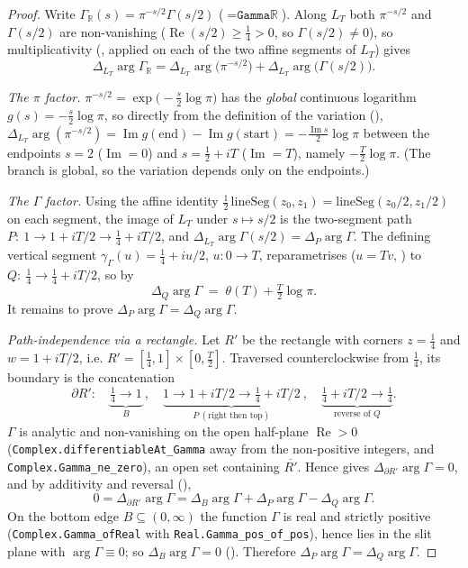 \begin{proof}
\leanok
{}
Write $\Gamma_{\mathbb R}(s)=\pi^{-s/2}\Gamma(s/2)$ ($=\texttt{Gammaℝ}$). Along $L_T$ both
$\pi^{-s/2}$ and $\Gamma(s/2)$ are non-vanishing ($\operatorname{Re}(s/2)\ge\tfrac14>0$,
so $\Gamma(s/2)\neq0$), so multiplicativity (, applied on each
of the two affine segments of $L_T$) gives
\[
  \Delta_{L_T}\arg\Gamma_{\mathbb R}
   = \Delta_{L_T}\arg\bigl(\pi^{-s/2}\bigr) + \Delta_{L_T}\arg\bigl(\Gamma(s/2)\bigr).
\]

\emph{The $\pi$ factor.} $\pi^{-s/2}=\exp\!\bigl(-\tfrac{s}{2}\log\pi\bigr)$ has the
\emph{global} continuous logarithm $g(s)=-\tfrac{s}{2}\log\pi$, so directly from the
definition of the variation (),
$\Delta_{L_T}\arg(\pi^{-s/2})=\operatorname{Im} g(\text{end})-\operatorname{Im}
g(\text{start})=-\tfrac{\operatorname{Im} s}{2}\log\pi$ between the endpoints $s=2$
($\operatorname{Im}=0$) and $s=\tfrac12+iT$ ($\operatorname{Im}=T$), namely
$-\tfrac{T}{2}\log\pi$. (The branch is global, so the variation depends only on the
endpoints.)

\emph{The $\Gamma$ factor.} Using the affine identity
$\tfrac12\,\mathrm{lineSeg}(z_0,z_1)=\mathrm{lineSeg}(z_0/2,z_1/2)$ on each segment, the
image of $L_T$ under $s\mapsto s/2$ is the two-segment path
$P:\ 1\to1+iT/2\to\tfrac14+iT/2$, and $\Delta_{L_T}\arg\Gamma(s/2)=\Delta_P\arg\Gamma$.
The defining vertical segment $\gamma_\Gamma(u)=\tfrac14+iu/2$, $u:0\to T$, reparametrises
($u=Tv$, ) to $Q:\ \tfrac14\to\tfrac14+iT/2$, so by
\[
  \Delta_Q\arg\Gamma \;=\; \theta(T)+\tfrac{T}{2}\log\pi .
\]
It remains to prove $\Delta_P\arg\Gamma=\Delta_Q\arg\Gamma$.

\emph{Path-independence via a rectangle.} Let $R'$ be the rectangle with corners
$z=\tfrac14$ and $w=1+iT/2$, i.e. $R'=[\tfrac14,1]\times[0,\tfrac T2]$. Traversed
counterclockwise from $\tfrac14$, its boundary is the concatenation
\[
  \partial R':\quad
  \underbrace{\tfrac14\to1}_{B}\ ,\quad
  \underbrace{1\to1+iT/2\to\tfrac14+iT/2}_{P\ (\text{right then top})}\ ,\quad
  \underbrace{\tfrac14+iT/2\to\tfrac14}_{\text{reverse of }Q}.
\]
$\Gamma$ is analytic and non-vanishing on the open half-plane $\operatorname{Re}>0$
(\texttt{Complex.differentiableAt\_Gamma} away from the non-positive integers, and
\texttt{Complex.Gamma\_ne\_zero}), an open set containing $\overline{R'}$. Hence
 gives $\Delta_{\partial R'}\arg\Gamma=0$, and by
additivity and reversal (),
\[
  0=\Delta_{\partial R'}\arg\Gamma
   =\Delta_B\arg\Gamma+\Delta_P\arg\Gamma-\Delta_Q\arg\Gamma .
\]
On the bottom edge $B\subseteq(0,\infty)$ the function $\Gamma$ is real and strictly
positive (\texttt{Complex.Gamma\_ofReal} with \texttt{Real.Gamma\_pos\_of\_pos}), hence
lies in the slit plane with $\arg\Gamma\equiv0$; so $\Delta_B\arg\Gamma=0$
(). Therefore $\Delta_P\arg\Gamma=\Delta_Q\arg\Gamma$.


\end{proof}
